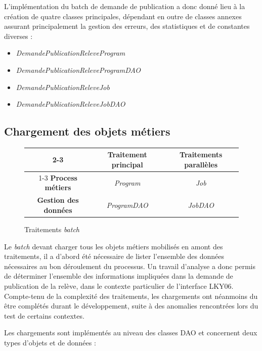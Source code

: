 \documentclass[a4paper, 12pt]{report}
\begin{document}
L'implémentation du batch de demande de publication a donc donné lieu à la création de quatre classes principales, dépendant en outre de classes annexes assurant principalement la gestion des erreurs, des statistiques et de constantes diverses :\\

\begin{itemize}
  \item \textit{DemandePublicationReleveProgram}
  \item \textit{DemandePublicationReleveProgramDAO}
  \item \textit{DemandePublicationReleveJob}
  \item \textit{DemandePublicationReleveJobDAO}
\end{itemize}

\subsection{Chargement des objets métiers}

\begin{figure}[t]
  \begin{center}
    \begin{tabular}{|c|c|c|}
      \cline{2-3}
      \multicolumn{1}{ c| }{} & \textbf{Traitement principal} & \textbf{Traitements parallèles} \\
      \cline{1-3}
      \textbf{Process métiers} & \textit{Program} & \textit{Job} \\ 
      \hline
      \textbf{Gestion des données} & \textit{ProgramDAO} & \textit{JobDAO} \\
      \hline
    \end{tabular}
    \caption{Traitements \textit{batch}}
    \label{division}
  \end{center}
\end{figure}

Le \textit{batch} devant charger tous les objets métiers mobilisés en amont des traitements, il a d'abord été nécessaire de lister l'ensemble des données nécessaires au bon déroulement du processus. Un travail d'analyse a donc permis de déterminer l'ensemble des informations impliquées dans la demande de publication de la relève, dans le contexte particulier de l'interface LKY06. Compte-tenu de la complexité des traitements, les chargements ont néanmoins du être complétés durant le développement, suite à des anomalies rencontrées lors du test de certains contextes.

Les chargements sont implémentés au niveau des classes DAO et concernent deux types d'objets et de données :\\
\end{document}
